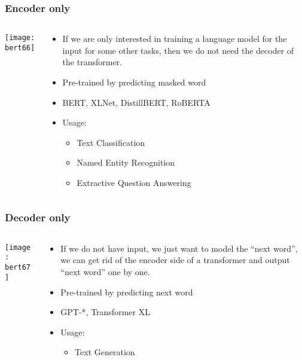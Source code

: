 \begin{frame}[fragile]\frametitle{Encoder only}

\begin{columns}
    \begin{column}[T]{0.5\linewidth}
			\begin{center}
			\texttt{[image: bert66]}
			\end{center}		
		\end{column}
    \begin{column}[T]{0.5\linewidth}
      \begin{itemize}
			\item If we are only interested in training a language model for the input for some other tasks, then we do not need the decoder of the transformer. 
			\item Pre-trained by predicting masked word
			\item BERT, XLNet, DistillBERT, RoBERTA
			\item Usage:
      \begin{itemize}
			\item Text Classification
			\item Named Entity Recognition
			\item Extractive Question Answering
			\end{itemize}
			\end{itemize}
    \end{column}
  \end{columns}
			
\end{frame}

\begin{frame}[fragile]\frametitle{Decoder only}

\begin{columns}
    \begin{column}[T]{0.5\linewidth}
			\begin{center}
			\texttt{[image: bert67]}
			\end{center}		
		\end{column}
    \begin{column}[T]{0.5\linewidth}
      \begin{itemize}
			\item If we do not have input, we just want to model the “next word”, we can get rid of the encoder side of a transformer and output “next word” one by one. 
			\item Pre-trained by predicting next word
			\item GPT-*, Transformer XL
			\item Usage:
      \begin{itemize}
			\item Text Generation
			\end{itemize}
			\end{itemize}
    \end{column}
  \end{columns}
			
\end{frame}

